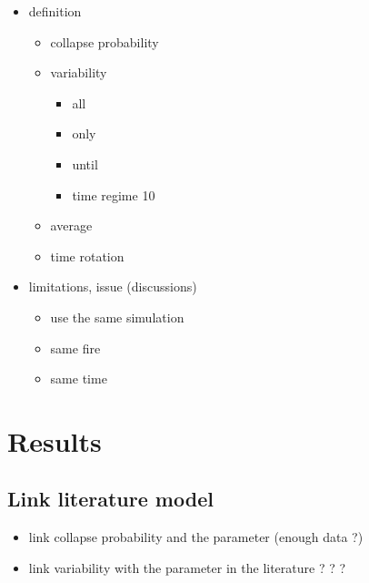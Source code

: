 \documentclass{article}
\begin{document}
    
    

\begin{itemize}
    \item definition
    \begin{itemize}
        \item collapse probability
        \item variability
            \begin{itemize}
                \item all
                \item only
                \item until
                \item time regime 10
            \end{itemize}
        \item average
        \item time rotation
    \end{itemize}
    \item limitations, issue (discussions)
    \begin{itemize}
        \item use the same simulation
        \item same fire
        \item same time
    \end{itemize}
\end{itemize}





\newpage
\section{Results}

\subsection{Link literature model}

\begin{itemize}
    \item link collapse probability and the parameter (enough data ?)
    \item link variability with the parameter in the literature ? ? ? 
\end{itemize}
\end{document}
